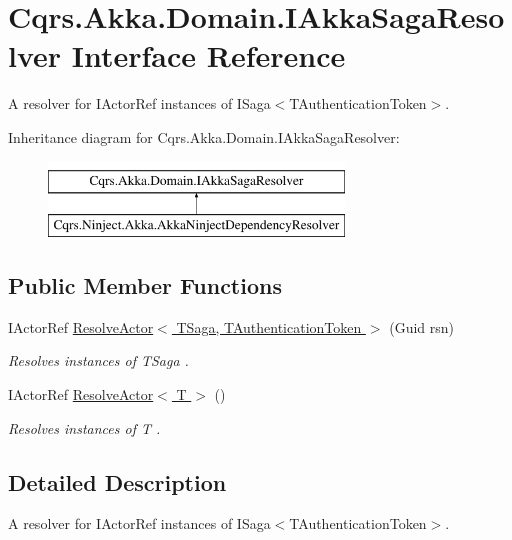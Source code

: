 \hypertarget{interfaceCqrs_1_1Akka_1_1Domain_1_1IAkkaSagaResolver}{}\section{Cqrs.\+Akka.\+Domain.\+I\+Akka\+Saga\+Resolver Interface Reference}
\label{interfaceCqrs_1_1Akka_1_1Domain_1_1IAkkaSagaResolver}


A resolver for I\+Actor\+Ref instances of I\+Saga$<$\+T\+Authentication\+Token$>$.  


Inheritance diagram for Cqrs.\+Akka.\+Domain.\+I\+Akka\+Saga\+Resolver\+:\begin{figure}[H]
\begin{center}
\leavevmode
\includegraphics[height=2.000000cm]{interfaceCqrs_1_1Akka_1_1Domain_1_1IAkkaSagaResolver}
\end{center}
\end{figure}
\subsection*{Public Member Functions}
\begin{DoxyCompactItemize}
\item 
I\+Actor\+Ref \hyperlink{interfaceCqrs_1_1Akka_1_1Domain_1_1IAkkaSagaResolver_ab41671bdbd0d7d83552b5e11e47fe36d_ab41671bdbd0d7d83552b5e11e47fe36d}{Resolve\+Actor$<$ T\+Saga, T\+Authentication\+Token $>$} (Guid rsn)
\begin{DoxyCompactList}\small\item\em Resolves instances of {\itshape T\+Saga} . \end{DoxyCompactList}\item 
I\+Actor\+Ref \hyperlink{interfaceCqrs_1_1Akka_1_1Domain_1_1IAkkaSagaResolver_adb17ca8a4e09839e67bc9fa0a6ee843f_adb17ca8a4e09839e67bc9fa0a6ee843f}{Resolve\+Actor$<$ T $>$} ()
\begin{DoxyCompactList}\small\item\em Resolves instances of {\itshape T} . \end{DoxyCompactList}\end{DoxyCompactItemize}


\subsection{Detailed Description}
A resolver for I\+Actor\+Ref instances of I\+Saga$<$\+T\+Authentication\+Token$>$. 



